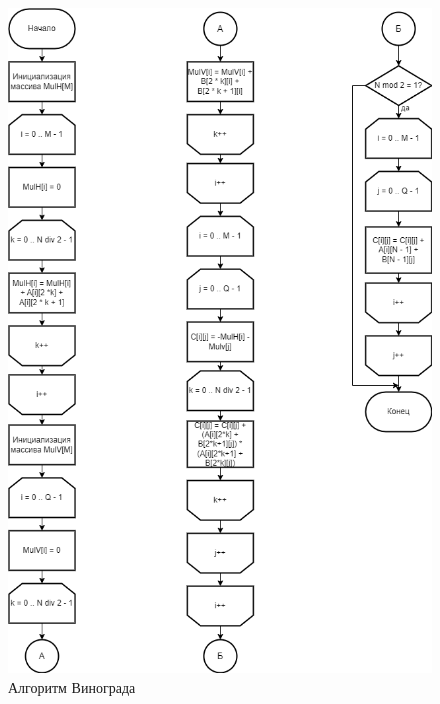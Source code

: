 \begin{figure}[H]
	\centering
	\includegraphics[scale=0.6]{inc/img/vino}
	\caption{Алгоритм Винограда}
	\label{fig:vino}
\end{figure}


